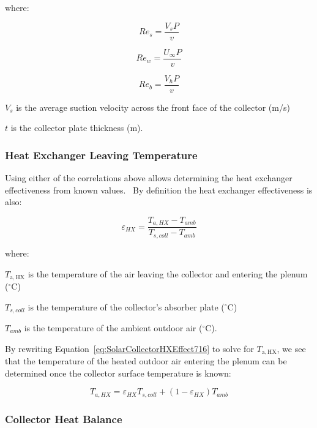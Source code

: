 where:

\begin{equation}
{Re_s} = \frac{{{V_s}P}}{v}
\end{equation}

\begin{equation}
{Re_w} = \frac{{{U_\infty }P}}{v}
\end{equation}

\begin{equation}
{Re_b} = \frac{{{V_h}P}}{v}
\end{equation}

\({V_s}\) is the average suction velocity across the front face of the collector (m/s)

\(t\) is the collector plate thickness (m).

\subsubsection{Heat Exchanger Leaving Temperature}\label{heat-exchanger-leaving-temperature}

Using either of the correlations above allows determining the heat exchanger effectiveness from known values.~ By definition the heat exchanger effectiveness is also:

\begin{equation}
{\varepsilon_{HX}} = \frac{{{T_{a,HX}} - {T_{amb}}}}{{{T_{s,coll}} - {T_{amb}}}}
\label{eq:SolarCollectorHXEffect716}
\end{equation}

where:

\({T_{{\mathrm{a,HX}}}}\) is the temperature of the air leaving the collector and entering the plenum (\(^{\circ}\)C)

\({T_{s,coll}}\) is the temperature of the collector's absorber plate (\(^{\circ}\)C)

\({T_{amb}}\) is the temperature of the ambient outdoor air (\(^{\circ}\)C).

By rewriting Equation~\ref{eq:SolarCollectorHXEffect716} to solve for \({T_{{\mathrm{a,HX}}}}\), we see that the temperature of the heated outdoor air entering the plenum can be determined once the collector surface temperature is known:

\begin{equation}
{T_{a,HX}} = {\varepsilon_{HX}}{T_{s,coll}} + \left( {1 - {\varepsilon_{HX}}} \right){T_{amb}}
\end{equation}

\subsubsection{Collector Heat Balance}\label{collector-heat-balance}

